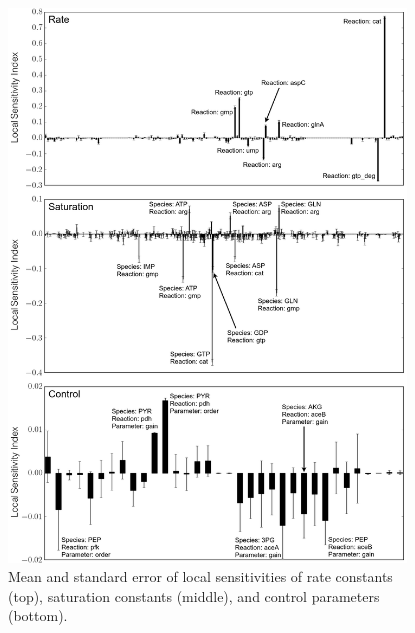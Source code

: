 \documentclass[12pt]{article}
\begin{document}
\begin{figure}[ht]
\centering
\includegraphics[width=0.94\textwidth]{./Figures/SensAll.png}
\caption{Mean and standard error of local sensitivities of rate constants (top), saturation constants (middle), and control parameters (bottom).}
\label{fig:LocalSensitivity}
\end{figure}
\end{document}
